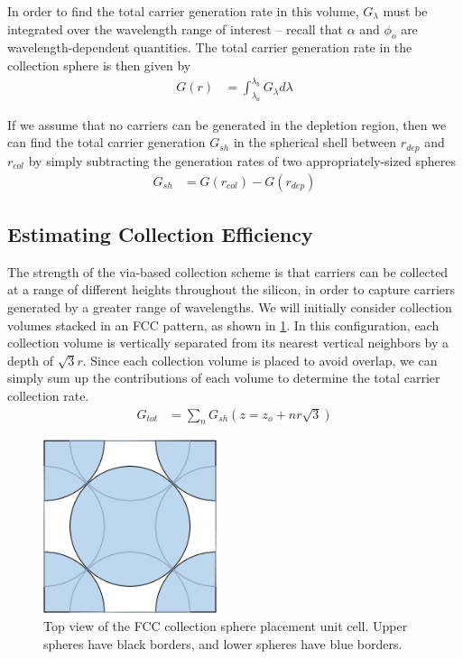\documentclass[journal,twoside]{IEEEtran}
\begin{document}
In order to find the total carrier generation rate in this volume, $G_\lambda$ must be integrated over the wavelength range of interest --
recall that $\alpha$ and $\phi_o$ are wavelength-dependent quantities. The total carrier generation rate in the collection sphere is
then given by
\begin{align}
	G(r) &= \int_{\lambda_a}^{\lambda_b} G_\lambda d\lambda
\end{align}

If we assume that no carriers can be generated in the depletion region, then we can find the total carrier generation $G_{sh}$ in the spherical
shell between $r_{dep}$ and $r_{col}$ by simply subtracting the generation rates of two appropriately-sized spheres
\begin{align}
	G_{sh} &= G(r_{col}) - G(r_{dep})	\label{eq-generation-rate-shell}
\end{align}

\subsection{Estimating Collection Efficiency}
The strength of the via-based collection scheme is that carriers can be collected at a range of different heights
throughout the silicon, in order to capture carriers generated by a greater range of wavelengths. We will initially consider collection
volumes stacked in an FCC pattern, as shown in \cref{f-collection-volume-stack}. In this configuration, each collection volume
is vertically separated from its nearest vertical neighbors by a depth of $\sqrt{3}r$. Since each collection volume is placed
to avoid overlap, we can simply sum up the contributions of each volume to determine the total carrier collection rate.
\begin{align}
	G_{tot} &= \sum_n G_{sh}(z=z_o + nr\sqrt{3})	\label{eq-generation-rate-unit-cell}
\end{align}

\begin{figure}[tb]
	\centering
	\includegraphics[width=2.0in]{figures/fcc_top_view.png}
	\caption{	Top view of the FCC collection sphere placement unit cell. Upper spheres have black borders,
				and lower spheres have blue borders.}
	\label{f-collection-volume-stack}
\end{figure}
\end{document}

